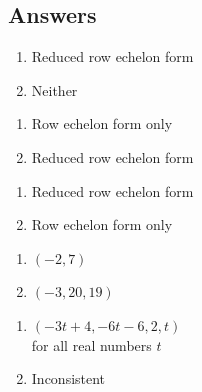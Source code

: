 \newpage

\subsection{Answers}

\begin{multicols}{2}
\begin{enumerate}

\item Reduced row echelon form
\item Neither

\setcounter{HW}{\value{enumi}}
\end{enumerate}
\end{multicols}


\begin{multicols}{2}
\begin{enumerate}
\setcounter{enumi}{\value{HW}}



\item Row echelon form only
\item Reduced row echelon form

\setcounter{HW}{\value{enumi}}
\end{enumerate}
\end{multicols}


\begin{multicols}{2}
\begin{enumerate}
\setcounter{enumi}{\value{HW}}

\item Reduced row echelon form
\item Row echelon form only

\setcounter{HW}{\value{enumi}}
\end{enumerate}
\end{multicols}

\begin{multicols}{2}
\begin{enumerate}
\setcounter{enumi}{\value{HW}}

\item $(-2, 7)$
\item $(-3, 20, 19)$

\setcounter{HW}{\value{enumi}}
\end{enumerate}
\end{multicols}


\begin{multicols}{2}
\begin{enumerate}
\setcounter{enumi}{\value{HW}}

\item $(-3t + 4, -6t - 6, 2, t)$ \\
for all real numbers $t$
\item Inconsistent


\setcounter{HW}{\value{enumi}}
\end{enumerate}
\end{multicols}


